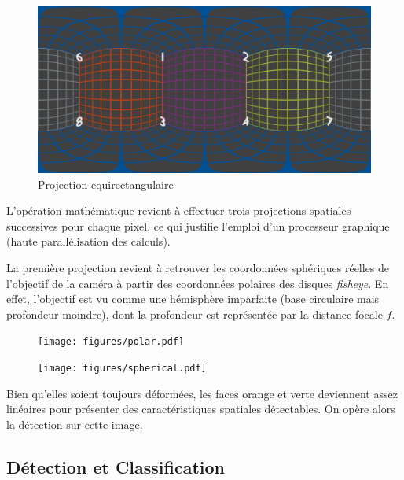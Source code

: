 			\begin{figure}[H]
			{
				\centering
				\includegraphics[width=1\textwidth]{figures/equirect.png}
				\caption{Projection equirectangulaire}
				\label{fig:equirect}
			}
			\end{figure}
			L'opération mathématique revient à effectuer trois projections spatiales successives pour chaque pixel, ce qui justifie l'emploi d'un processeur graphique (haute parallélisation des calculs).
			\par
			La première projection revient à retrouver les coordonnées sphériques réelles de l'objectif de la caméra à partir des coordonnées polaires des disques \emph{fisheye}. En effet, l'objectif est vu comme une hémisphère imparfaite (base circulaire mais profondeur moindre), dont la profondeur est représentée par la distance focale $f$.
			\begin{figure}[htb]
				\centering
				\begin{minipage}{.5\textwidth}
					\centering
					\texttt{[image: figures/polar.pdf]}
					\label{fig:pcart1}
				\end{minipage}%
				\begin{minipage}{.5\textwidth}
					\centering
					\texttt{[image: figures/spherical.pdf]}
					\label{fig:def1}
				\end{minipage}
			\end{figure}

			
			Bien qu'elles soient toujours déformées, les faces orange et verte deviennent assez linéaires pour présenter des caractéristiques spatiales détectables. On opère alors la détection sur cette image.


		\subsection{Détection et Classification}
		
